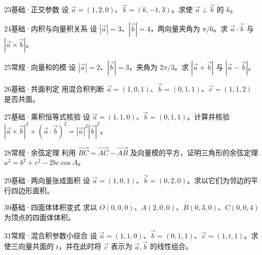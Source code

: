 \begin{exercise}{23}{基础·正交参数}
设 $\vec a=(1,2,0)$、$\vec b=(k,-1,3)$。求使 $\vec a\perp\vec b$ 的 $k$。
\end{exercise}
\begin{exercise}{24}{基础·内积与向量积关系}
设 $|\vec a|=3$、$|\vec b|=4$，两向量夹角为 $\pi/6$。求 $\vec a\cdot\vec b$ 与 $|\vec a\times\vec b|$。
\end{exercise}
\begin{exercise}{25}{常规·向量和的模}
设 $|\vec a|=2$、$|\vec b|=3$，夹角为 $2\pi/3$。求 $|\vec a+\vec b|$ 与 $|\vec a-\vec b|$。
\end{exercise}
\begin{exercise}{26}{基础·共面判定}
用混合积判断 $\vec a=(1,0,1)$、$\vec b=(0,1,1)$、$\vec c=(1,1,2)$ 是否共面。
\end{exercise}
\begin{exercise}{27}{基础·乘积恒等式核验}
设 $\vec a=(1,1,0)$、$\vec b=(0,1,1)$。计算并核验 $|\vec a\times\vec b|^2+(\vec a\cdot\vec b)^2=|\vec a|^2|\vec b|^2$。
\end{exercise}
\begin{exercise}{28}{常规·余弦定理}
利用 $\overrightarrow{BC}=\overrightarrow{AC}-\overrightarrow{AB}$ 及向量模的平方，证明三角形的余弦定理 $a^2=b^2+c^2-2bc\cos A$。
\end{exercise}
\begin{exercise}{29}{基础·两向量张成面积}
设 $\vec a=(1,0,1)$、$\vec b=(0,2,0)$。求以它们为邻边的平行四边形面积。
\end{exercise}
\begin{exercise}{30}{基础·四面体体积变式}
求以 $O(0,0,0)$、$A(2,0,0)$、$B(0,3,0)$、$C(0,0,4)$ 为顶点的四面体体积。
\end{exercise}
\begin{exercise}{31}{常规·混合积参数小综合}
设 $\vec a=(1,1,0)$、$\vec b=(0,1,1)$、$\vec c=(1,t,1)$。求使三向量共面的 $t$，并在此时将 $\vec c$ 表示为 $\vec a,\vec b$ 的线性组合。
\end{exercise}
